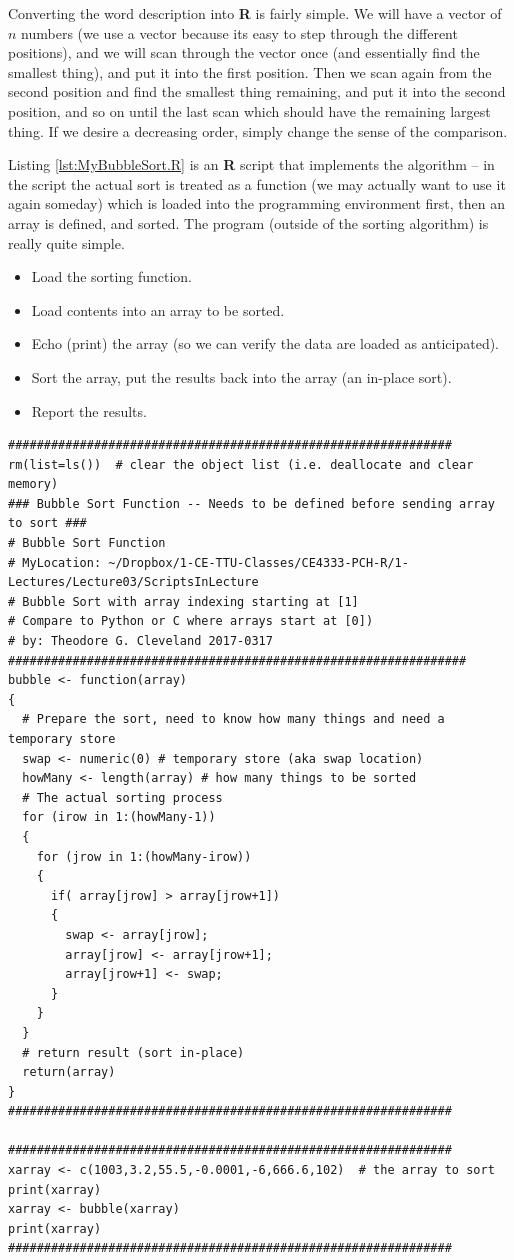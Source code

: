 Converting the word description into \textbf{R} is fairly simple.  We will have a vector of $n$ numbers (we use a vector because its easy to step through the different positions), and we will scan through the vector once (and essentially find the smallest thing), and put it into the first position.  Then we scan again from the second position and find the smallest thing remaining, and put it into the second position, and so on until the last scan which should have the remaining largest thing.  If we desire a decreasing order, simply change the sense of the comparison.  

Listing \ref{lst:MyBubbleSort.R} is an \textbf{R} script that implements the algorithm -- in the script the actual sort is treated as a function (we may actually want to use it again someday) which is loaded into the programming environment first, then an array is defined, and sorted.  The program (outside of the sorting algorithm) is really quite simple.  
\begin{itemize}
\item Load the sorting function.
\item Load contents into an array to be sorted.
\item Echo (print) the array (so we can verify the data are loaded as anticipated).
\item Sort the array, put the results back into the array (an in-place sort).
\item Report the results.
\end{itemize}

\begin{lstlisting}[caption=R code demonstrating the naive bubble sort, label=lst:MyBubbleSort.R]
##############################################################
rm(list=ls())  # clear the object list (i.e. deallocate and clear memory)
### Bubble Sort Function -- Needs to be defined before sending array to sort ###
# Bubble Sort Function
# MyLocation: ~/Dropbox/1-CE-TTU-Classes/CE4333-PCH-R/1-Lectures/Lecture03/ScriptsInLecture
# Bubble Sort with array indexing starting at [1] 
# Compare to Python or C where arrays start at [0])
# by: Theodore G. Cleveland 2017-0317
################################################################
bubble <- function(array)
{
  # Prepare the sort, need to know how many things and need a temporary store
  swap <- numeric(0) # temporary store (aka swap location)
  howMany <- length(array) # how many things to be sorted
  # The actual sorting process
  for (irow in 1:(howMany-1))
  {
    for (jrow in 1:(howMany-irow))
    {
      if( array[jrow] > array[jrow+1])
      {
        swap <- array[jrow];
        array[jrow] <- array[jrow+1];
        array[jrow+1] <- swap;
      }
    } 
  }
  # return result (sort in-place)
  return(array)
}
##############################################################

##############################################################
xarray <- c(1003,3.2,55.5,-0.0001,-6,666.6,102)  # the array to sort
print(xarray)
xarray <- bubble(xarray)
print(xarray)
##############################################################
\end{lstlisting}  

